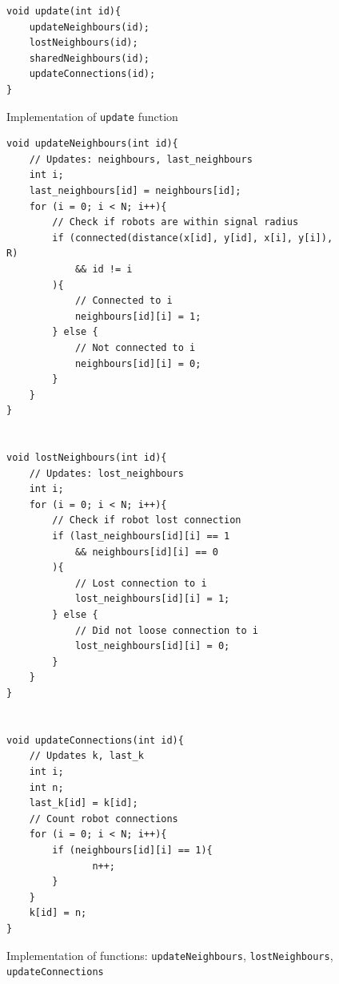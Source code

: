 \begin{figure}[H]
\caption{Implementation of \texttt{update} function}
\begin{lstlisting}[style=C++]
void update(int id){
    updateNeighbours(id);
    lostNeighbours(id);
    sharedNeighbours(id);
    updateConnections(id);
}
\end{lstlisting}
\label{fig:update}
\end{figure}


\begin{figure}[H]
\caption{Implementation of functions: \texttt{updateNeighbours}, \texttt{lostNeighbours}, \texttt{updateConnections}}
\begin{lstlisting}[style=C++]
void updateNeighbours(int id){
    // Updates: neighbours, last_neighbours
    int i;
    last_neighbours[id] = neighbours[id];
    for (i = 0; i < N; i++){
        // Check if robots are within signal radius
        if (connected(distance(x[id], y[id], x[i], y[i]), R) 
            && id != i
        ){
            // Connected to i
            neighbours[id][i] = 1;  
        } else {
            // Not connected to i
            neighbours[id][i] = 0;  
        }
    }
}


void lostNeighbours(int id){
    // Updates: lost_neighbours
    int i;
    for (i = 0; i < N; i++){
        // Check if robot lost connection
        if (last_neighbours[id][i] == 1 
            && neighbours[id][i] == 0
        ){
            // Lost connection to i
            lost_neighbours[id][i] = 1;
        } else {
            // Did not loose connection to i
            lost_neighbours[id][i] = 0; 
        }
    }
}


void updateConnections(int id){
    // Updates k, last_k
    int i;
    int n;
    last_k[id] = k[id];
    // Count robot connections
    for (i = 0; i < N; i++){
        if (neighbours[id][i] == 1){
               n++;
        }
    }
    k[id] = n;
}
\end{lstlisting}
\label{fig:update_3}
\end{figure}

